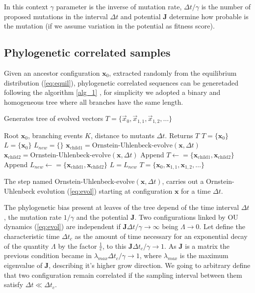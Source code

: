 \documentclass[reprint,amsmath,amssymb,superscriptaddress,showpacs,pre]{revtex4-1}
\def\vx{\vec x}
\begin{document}
In this context  $\gamma$ parameter  is the inverse of mutation rate, $\Delta t/\gamma$ is the number of proposed mutations in the interval $\Delta t$ and  potential $\bm J$ determine  how probable is the mutation (if we assume variation in the potential as fitness score).

\subsection{Phylogenetic correlated samples}
Given an  ancestor  configuration $\mathbf{x}_0$,  extracted randomly from the equilibrium distribution (\ref{eq:equil}),  phylogenetic correlated sequences can be generetaded   following the algorithm \ref{alg_1} ,  for simplicity we adopted a binary and homogeneous tree where all branches have the same length.

\begin{algorithm} [H]
			\caption{Generates tree of evolved vectors $T = \{\vx_0, \vx_{1,1}, \vx_{1,2}, \ldots\}$}
				\label{alg_1}
	\begin{algorithmic}[1]
		\REQUIRE Root $\mathbf{x}_0$, branching events $K$, distance to mutants $\Delta t$.
		\ENSURE Returns $T$
		\STATE $T = \{ \mathbf{x}_0 \}$  
		\STATE $L = \{\mathbf{x}_0 \} $  
		\STATE $L_{new} = \{\}$ 
		\STATE $\mathbf{x}_{\mbox{child1}} = \mbox{Ornstein-Uhlenbeck-evolve}(\mathbf{x}, \Delta t)$
		\STATE $\mathbf{x}_{\mbox{child2}} = \mbox{Ornstein-Uhlenbeck-evolve}(\mathbf{x}, \Delta t)$
		\STATE Append $T \leftarrow= \{\mathbf{x}_{\mbox{child1}}, \mathbf{x}_{\mbox{child2}}\}$
		\STATE Append $L_{new} \leftarrow= \{\mathbf{x}_{\mbox{child1}}, \mathbf{x}_{\mbox{child2}}\}$
		\ENDFOR
		\STATE $L = L_{new}$
		\ENDFOR
		\RETURN $T = \{\mathbf{x}_0, \mathbf{x}_{1,1}, \mathbf{x}_{1,2}, \ldots\}$
	\end{algorithmic} 
\end{algorithm}

The step named Ornstein-Uhlenbeck-evolve$(\mathbf{x},\Delta t)$, carries out a Ornstein-Uhlenbeck evolution (\ref{eq:evol}) starting at configuration $\mathbf{x}$  for a time $\Delta t$. 

The phylogenetic bias present at leaves of the tree depend of the time interval $\Delta t$, the mutation rate $1/\gamma$ and the potential $\bm J$.  Two configurations linked by  OU dynamics (\ref{eq:evol})   are independent  if $\bm J\Delta t /\gamma\rightarrow \infty$ being $\Lambda\rightarrow 0$. Let define the  characteristic time $\Delta t_c$ as the amount of time necessary for an exponential decay of the  quantity   $\Lambda$ by the factor $\frac{1}{e}$, to this  $\bm J\Delta t_c/\gamma \rightarrow 1$.  As $\bm J$ is a matrix  the previous condition became  in $\lambda_{max}\Delta t_c /\gamma\rightarrow1$, where  $\lambda_{max}$  is the  maximum eigenvalue of $\bm J$, describing it's higher grow direction.  We going to  arbitrary define that two configuration remain correlated  if the sampling interval between them satisfy $\Delta t \ll\Delta t_c$. 
\end{document}
